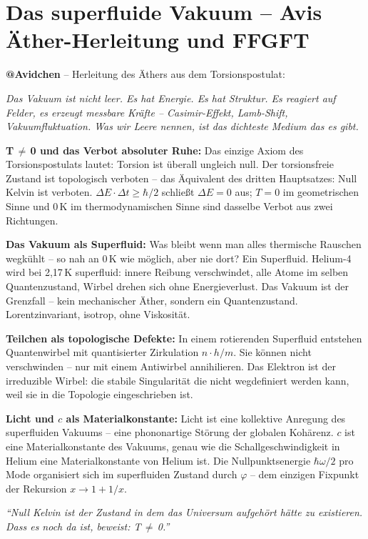\documentclass[12pt, a4paper]{article}
\begin{document}
\section{Das superfluide Vakuum -- Avis Äther-Herleitung und FFGFT}

\begin{avipost}
\textbf{@Avidchen} -- Herleitung des Äthers aus dem Torsionspostulat:

\medskip
\textit{Das Vakuum ist nicht leer. Es hat Energie. Es hat Struktur. Es reagiert auf Felder, es erzeugt messbare Kräfte -- Casimir-Effekt, Lamb-Shift, Vakuumfluktuation. Was wir Leere nennen, ist das dichteste Medium das es gibt.}

\medskip
\textbf{T\,$\neq$\,0 und das Verbot absoluter Ruhe:} Das einzige Axiom des Torsionspostulats lautet: Torsion ist überall ungleich null. Der torsionsfreie Zustand ist topologisch verboten -- das Äquivalent des dritten Hauptsatzes: Null Kelvin ist verboten. $\Delta E \cdot \Delta t \geq \hbar/2$ schließt $\Delta E = 0$ aus; $T=0$ im geometrischen Sinne und 0\,K im thermodynamischen Sinne sind dasselbe Verbot aus zwei Richtungen.

\medskip
\textbf{Das Vakuum als Superfluid:} Was bleibt wenn man alles thermische Rauschen wegkühlt -- so nah an 0\,K wie möglich, aber nie dort? Ein Superfluid. Helium-4 wird bei 2{,}17\,K superfluid: innere Reibung verschwindet, alle Atome im selben Quantenzustand, Wirbel drehen sich ohne Energieverlust. Das Vakuum ist der Grenzfall -- kein mechanischer Äther, sondern ein Quantenzustand. Lorentzinvariant, isotrop, ohne Viskosität.

\medskip
\textbf{Teilchen als topologische Defekte:} In einem rotierenden Superfluid entstehen Quantenwirbel mit quantisierter Zirkulation $n \cdot h/m$. Sie können nicht verschwinden -- nur mit einem Antiwirbel annihilieren. Das Elektron ist der irreduzible Wirbel: die stabile Singularität die nicht wegdefiniert werden kann, weil sie in die Topologie eingeschrieben ist.

\medskip
\textbf{Licht und $c$ als Materialkonstante:} Licht ist eine kollektive Anregung des superfluiden Vakuums -- eine phononartige Störung der globalen Kohärenz. $c$ ist eine Materialkonstante des Vakuums, genau wie die Schallgeschwindigkeit in Helium eine Materialkonstante von Helium ist. Die Nullpunktsenergie $\hbar\omega/2$ pro Mode organisiert sich im superfluiden Zustand durch $\varphi$ -- dem einzigen Fixpunkt der Rekursion $x \to 1 + 1/x$.

\medskip
\textit{``Null Kelvin ist der Zustand in dem das Universum aufgehört hätte zu existieren. Dass es noch da ist, beweist: T\,$\neq$\,0.''}
\end{avipost}
\end{document}
